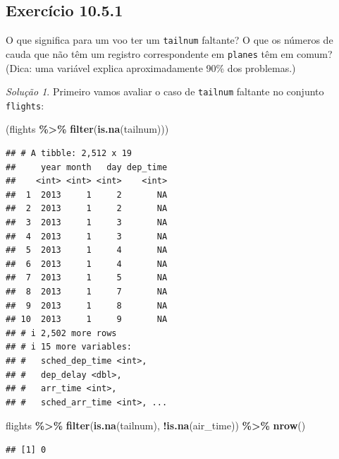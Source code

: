 \documentclass[
]{latex/krantz}
\newenvironment{Shaded}{\begin{snugshade}}{\end{snugshade}}
\newcommand{\FunctionTok}[1]{\textcolor[rgb]{0.13,0.29,0.53}{\textbf{#1}}}
\newcommand{\NormalTok}[1]{#1}
\newcommand{\SpecialCharTok}[1]{\textcolor[rgb]{0.81,0.36,0.00}{\textbf{#1}}}
\theoremstyle{definition}
\theoremstyle{definition}
\theoremstyle{definition}
\theoremstyle{definition}
\theoremstyle{remark}
\newtheorem*{solution}{Solução}
\begin{document}
\hypertarget{exr10-5-1}{%
\subsection*{Exercício 10.5.1}\label{exr10-5-1}}

O que significa para um voo ter um \texttt{tailnum} faltante? O que os números de cauda que não têm um registro correspondente em \texttt{planes} têm em comum? (Dica: uma variável explica aproximadamente 90\% dos problemas.)

\begin{solution}
Primeiro vamos avaliar o caso de \texttt{tailnum} faltante no conjunto \texttt{flights}:

\begin{Shaded}
\begin{Highlighting}[]
\NormalTok{(flights }\SpecialCharTok{\%\textgreater{}\%}
  \FunctionTok{filter}\NormalTok{(}\FunctionTok{is.na}\NormalTok{(tailnum)))}
\end{Highlighting}
\end{Shaded}

\begin{verbatim}
## # A tibble: 2,512 x 19
##     year month   day dep_time
##    <int> <int> <int>    <int>
##  1  2013     1     2       NA
##  2  2013     1     2       NA
##  3  2013     1     3       NA
##  4  2013     1     3       NA
##  5  2013     1     4       NA
##  6  2013     1     4       NA
##  7  2013     1     5       NA
##  8  2013     1     7       NA
##  9  2013     1     8       NA
## 10  2013     1     9       NA
## # i 2,502 more rows
## # i 15 more variables:
## #   sched_dep_time <int>,
## #   dep_delay <dbl>,
## #   arr_time <int>,
## #   sched_arr_time <int>, ...
\end{verbatim}

\begin{Shaded}
\begin{Highlighting}[]
\NormalTok{flights }\SpecialCharTok{\%\textgreater{}\%}
  \FunctionTok{filter}\NormalTok{(}\FunctionTok{is.na}\NormalTok{(tailnum), }\SpecialCharTok{!}\FunctionTok{is.na}\NormalTok{(air\_time)) }\SpecialCharTok{\%\textgreater{}\%}
  \FunctionTok{nrow}\NormalTok{()}
\end{Highlighting}
\end{Shaded}

\begin{verbatim}
## [1] 0
\end{verbatim}


\end{solution}
\end{document}
